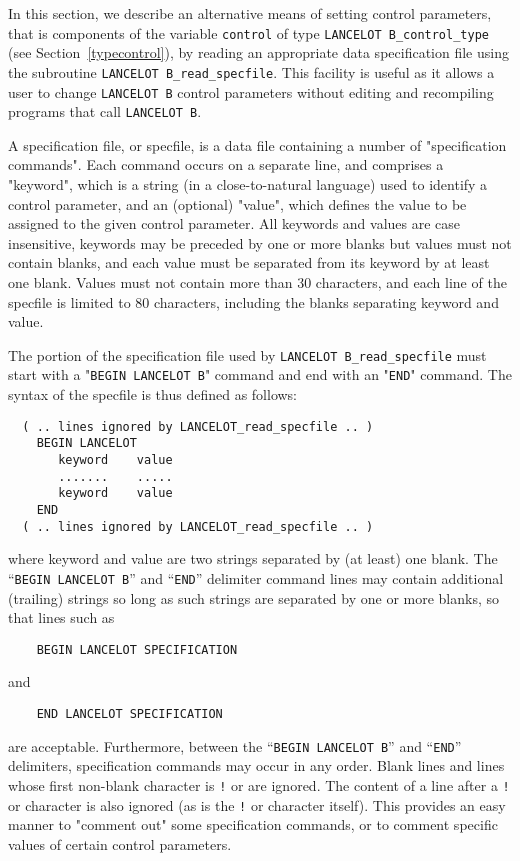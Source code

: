 \documentclass{galahad}
\newcommand{\packagename}{LANCELOT B}
\begin{document}

\galfeatures
\noindent In this section, we describe an alternative means of setting
control parameters, that is components of the variable {\tt control} of type
{\tt \packagename\_control\_type}
(see Section~\ref{typecontrol}),
by reading an appropriate data specification file using the
subroutine {\tt \packagename\_read\_specfile}. This facility is useful
as it allows a user to change  {\tt \packagename} control parameters
without editing and recompiling programs that call {\tt \packagename}.

A specification file, or specfile, is a data file containing a number of
"specification commands". Each command occurs on a separate line,
and comprises a "keyword",
which is a string (in a close-to-natural language) used to identify a
control parameter, and
an (optional) "value", which defines the value to be assigned to the given
control parameter. All keywords and values are case insensitive,
keywords may be preceded by one or more blanks but
values must not contain blanks, and
each value must be separated from its keyword by at least one blank.
Values must not contain more than 30 characters, and
each line of the specfile is limited to 80 characters,
including the blanks separating keyword and value.

The portion of the specification file used by
{\tt \packagename\_read\_specfile}
must start
with a "{\tt BEGIN \packagename}" command and end with an
"{\tt END}" command.  The syntax of the specfile is thus defined as follows:
\begin{verbatim}
  ( .. lines ignored by LANCELOT_read_specfile .. )
    BEGIN LANCELOT
       keyword    value
       .......    .....
       keyword    value
    END
  ( .. lines ignored by LANCELOT_read_specfile .. )
\end{verbatim}
where keyword and value are two strings separated by (at least) one blank.
The ``{\tt BEGIN \packagename}'' and ``{\tt END}'' delimiter command lines
may contain additional (trailing) strings so long as such strings are
separated by one or more blanks, so that lines such as
\begin{verbatim}
    BEGIN LANCELOT SPECIFICATION
\end{verbatim}
and
\begin{verbatim}
    END LANCELOT SPECIFICATION
\end{verbatim}
are acceptable. Furthermore,
between the
``{\tt BEGIN \packagename}'' and ``{\tt END}'' delimiters,
specification commands may occur in any order.  Blank lines and
lines whose first non-blank character is {\tt !} or {\tt *} are ignored.
The content
of a line after a {\tt !} or {\tt *} character is also
ignored (as is the {\tt !} or {\tt *}
character itself). This provides an easy manner to "comment out" some
specification commands, or to comment specific values
of certain control parameters.
\end{document}
